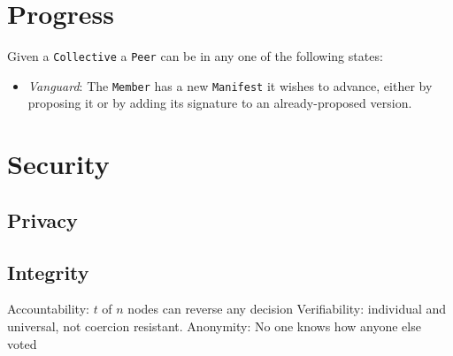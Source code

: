 \section{Progress}
Given a \texttt{Collective} a \texttt{Peer} can be in any
one of the following states:
\begin{itemize}
  \item \emph{Vanguard}: The \texttt{Member} has a new \texttt{Manifest} it
    wishes to advance, either by proposing it or by adding its signature to
    an already-proposed version.
\end{itemize}
\section{Security}
\subsection{Privacy}
\subsection{Integrity}

Accountability: $t$ of $n$ nodes can reverse any decision
Verifiability: individual and universal, not coercion resistant.
Anonymity: No one knows how anyone else voted
